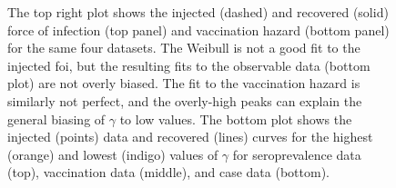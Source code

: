 \documentclass[nofootinbib,aps,pre,twocolumn,superscriptaddress,showkeys,showpacs]{revtex4-1}
\begin{document}
\begin{figure}
{The top right plot shows the injected (dashed) and recovered (solid) force of infection (top panel) and vaccination hazard (bottom panel) for the same four datasets. The Weibull is not a good fit to the injected foi, but the resulting fits to the observable data (bottom plot) are not overly biased. The fit to the vaccination hazard is similarly not perfect, and the overly-high peaks can explain the general biasing of $\gamma$ to low values. 
The bottom plot shows the injected (points) data and recovered (lines) curves for the highest (orange) and lowest (indigo) values of $\gamma$ for seroprevalence data (top), vaccination data (middle), and case data (bottom).}
\end{figure}



\end{document}
